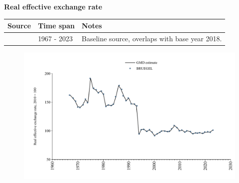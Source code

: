 \documentclass[12pt,a4paper,landscape]{article}
\begin{document}
\begin{adjustbox}{max totalsize={\paperwidth}{\paperheight},center}
\begin{minipage}[t][\textheight][t]{\textwidth}
\vspace*{0.5cm}
{}
\begin{center}
{\Large\bfseries Real effective exchange rate}
\end{center}
\vspace{0.5cm}
\begin{table}[H]
\centering
\small
\begin{tabular}{|l|l|l|}
\hline
\textbf{Source} & \textbf{Time span} & \textbf{Notes} \\
\hline
\rowcolor{white}\cite{BRUEGEL}& 1967 - 2023 &Baseline source, overlaps with base year 2018. \\
\hline
\end{tabular}
\end{table}
\begin{figure}[H]
\centering
\includegraphics[width=\textwidth,height=0.6\textheight,keepaspectratio]{graphs/SEN_REER.pdf}
\end{figure}
\end{minipage}
\end{adjustbox}
\end{document}
